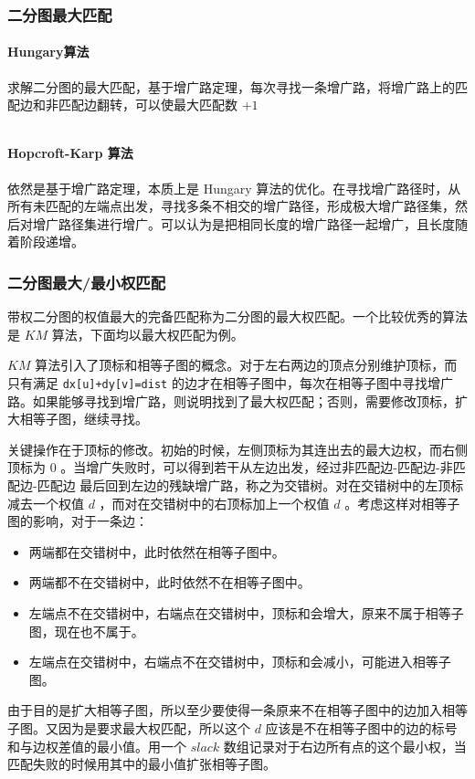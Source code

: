 \documentclass[UTF-8]{ctexart}
\newcommand{\cpp}[1]{\inputminted[bgcolor=bg,breaklines,breakanywhere=true]{c++}{#1}}
\begin{document}
			\subsubsection{二分图最大匹配}
			\paragraph{Hungary算法} 求解二分图的最大匹配，基于增广路定理，每次寻找一条增广路，将增广路上的匹配边和非匹配边翻转，可以使最大匹配数 $+1$
			\cpp{code//Graph//hungary.cpp}
			\paragraph{Hopcroft-Karp 算法} 依然是基于增广路定理，本质上是 Hungary 算法的优化。在寻找增广路径时，从所有未匹配的左端点出发，寻找多条不相交的增广路径，形成极大增广路径集，然后对增广路径集进行增广。可以认为是把相同长度的增广路径一起增广，且长度随着阶段递增。
			\subsubsection{二分图最大/最小权匹配}
			带权二分图的权值最大的完备匹配称为二分图的最大权匹配。一个比较优秀的算法是 $KM$ 算法，下面均以最大权匹配为例。
			
			$KM$ 算法引入了顶标和相等子图的概念。对于左右两边的顶点分别维护顶标，而只有满足 \texttt{dx[u]+dy[v]=dist} 的边才在相等子图中，每次在相等子图中寻找增广路。如果能够寻找到增广路，则说明找到了最大权匹配；否则，需要修改顶标，扩大相等子图，继续寻找。
			
			关键操作在于顶标的修改。初始的时候，左侧顶标为其连出去的最大边权，而右侧顶标为 $0$ 。当增广失败时，可以得到若干从左边出发，经过非匹配边-匹配边-非匹配边-匹配边 最后回到左边的残缺增广路，称之为交错树。对在交错树中的左顶标减去一个权值 $d$ ，而对在交错树中的右顶标加上一个权值 $d$ 。考虑这样对相等子图的影响，对于一条边：
			\begin{itemize}
				\item 两端都在交错树中，此时依然在相等子图中。
				\item 两端都不在交错树中，此时依然不在相等子图中。
				\item 左端点不在交错树中，右端点在交错树中，顶标和会增大，原来不属于相等子图，现在也不属于。
				\item 左端点在交错树中，右端点不在交错树中，顶标和会减小，可能进入相等子图。
			\end{itemize}
		
			由于目的是扩大相等子图，所以至少要使得一条原来不在相等子图中的边加入相等子图。又因为是要求最大权匹配，所以这个 $d$ 应该是不在相等子图中的边的标号和与边权差值的最小值。用一个 $slack$ 数组记录对于右边所有点的这个最小权，当匹配失败的时候用其中的最小值扩张相等子图。
			\cpp{code//Graph//km.cpp}
\end{document}
